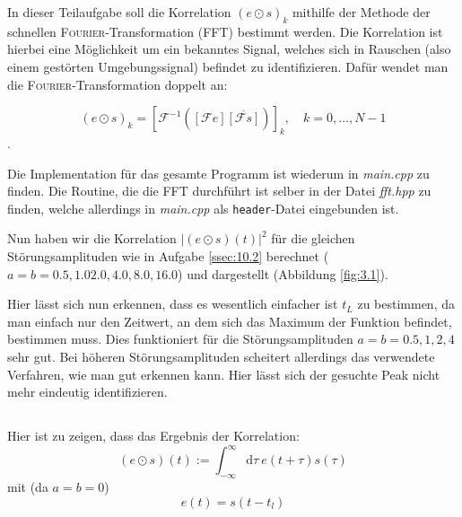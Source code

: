 \documentclass[ngerman]{scrartcl}
\begin{document}
In dieser Teilaufgabe soll die Korrelation $(e \odot s)_k$ mithilfe der Methode der schnellen \textsc{Fourier}-Transformation (FFT) bestimmt werden. Die Korrelation ist hierbei eine Möglichkeit um ein bekanntes Signal, welches sich in Rauschen (also einem gestörten Umgebungssignal) befindet zu identifizieren. Dafür wendet man die \textsc{Fourier}-Transformation doppelt an:

\begin{equation*}
	(e \odot s)_{k}=\left[\mathcal{F}^{-1}\left( [\mathcal{F} e] \overline{[\mathcal{F} s]}\right)\right]_{k}, \quad k=0, \ldots, N-1
\end{equation*}
.

Die Implementation für das gesamte Programm ist wiederum in \emph{main.cpp} zu finden. Die Routine, die die FFT durchführt ist selber in der Datei \emph{fft.hpp} zu finden, welche allerdings in \emph{main.cpp} als \verb|header|-Datei eingebunden ist.

Nun haben wir die Korrelation $|(e \odot s)(t)|^{2}$ für die gleichen Störungsamplituden wie in Aufgabe \ref{ssec:10.2} berechnet ($a=b=0.5,1.0 2.0, 4.0, 8.0, 16.0$) und dargestellt (Abbildung \ref{fig:3.1}).


Hier lässt sich nun erkennen, dass es wesentlich einfacher ist $t_L$ zu bestimmen, da man einfach nur den Zeitwert, an dem sich das Maximum der Funktion befindet, bestimmen muss. Dies funktioniert für die Störungsamplituden $a=b=0.5,1,2,4$ sehr gut. Bei höheren Störungsamplituden scheitert allerdings das verwendete Verfahren, wie man gut erkennen kann. Hier lässt sich der gesuchte Peak nicht mehr eindeutig identifizieren.






\subsection{}

Hier ist zu zeigen, dass das Ergebnis der Korrelation:
\begin{equation*}
	(e \odot s)(t):=\int_{-\infty}^{\infty} \mathrm{d} \tau~ e(t+\tau) s(\tau)
\end{equation*}
mit (da $a=b=0$)
\begin{equation}
\label{equ:5.1}
	e(t)= s(t-t_l)
\end{equation}
\end{document}
